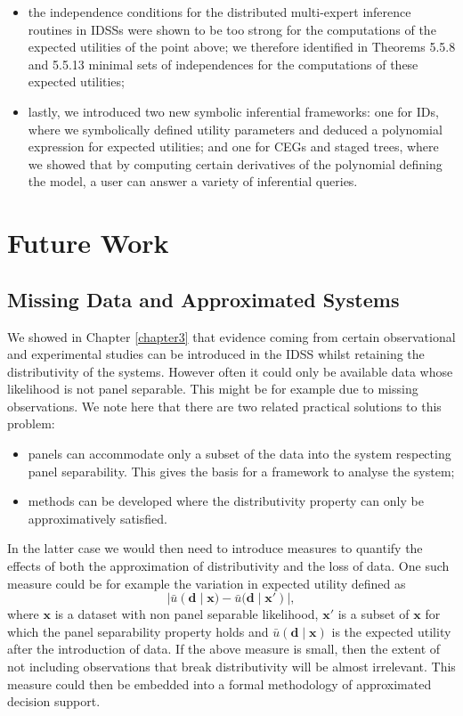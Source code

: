 \begin{itemize}
\item the independence conditions for the distributed multi-expert inference routines in IDSSs were shown to be too strong for the computations of the expected utilities of the point above; we therefore identified in Theorems 5.5.8 and 5.5.13 minimal sets of independences for the computations of these expected utilities;
\item lastly, we introduced two new symbolic inferential frameworks: one for IDs, where we symbolically defined utility parameters and deduced a polynomial expression for expected utilities; and one for CEGs and staged trees, where we showed that by computing certain derivatives of the polynomial defining the model, a user can answer a variety of inferential queries.    
\end{itemize}

\section*{Future Work }

\subsection*{Missing Data and Approximated Systems}
We showed in Chapter \ref{chapter3} that evidence coming from certain observational and experimental studies can be introduced in the IDSS whilst retaining the distributivity of the systems. However often it could only be available data whose likelihood is not panel separable. This might be for example due to missing observations. We note here that there are two related practical solutions to this problem: 
\begin{itemize}
\item panels can accommodate only a subset of the data into the system respecting panel separability. This gives the basis for a framework to analyse the system;
\item methods can be developed where the distributivity property can only be approximatively satisfied.
\end{itemize}
In the latter case we would then need to introduce measures to quantify the effects of both the approximation of distributivity and the loss of data. One such measure could be for example the variation in expected utility defined as
\[
|\bar{u}(\bm{d}\;|\;\bm{x})-\bar{u}(\bm{d}\;|\;\bm{x}')|,
\]  
where $\bm{x}$ is a dataset with non panel separable likelihood, $\bm{x}'$ is a subset of $\bm{x}$ for which the panel separability property holds and $\bar{u}(\bm{d}\;|\;\bm{x})$ is the expected utility after the introduction of data. If the above measure is small, then the extent of not including observations that break distributivity will be almost irrelevant. This measure could then be embedded into a formal methodology of approximated decision support.
 
